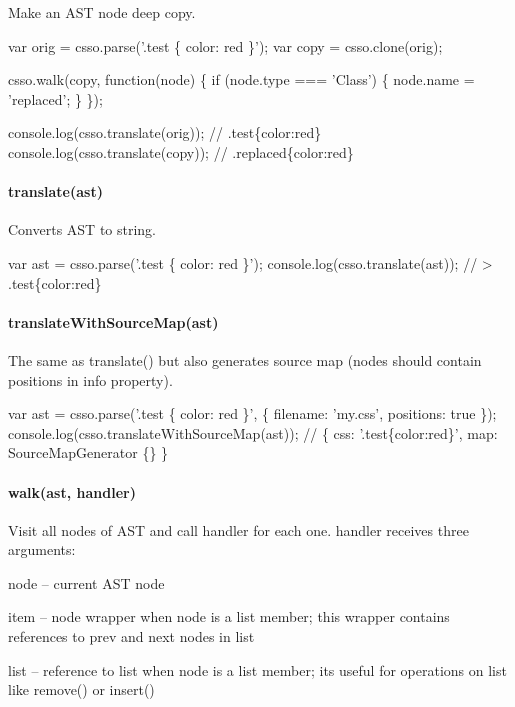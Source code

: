 Make an A\+ST node deep copy.


\begin{DoxyCode}
var orig = csso.parse('.test \{ color: red \}');
var copy = csso.clone(orig);

csso.walk(copy, function(node) \{
    if (node.type === 'Class') \{
        node.name = 'replaced';
    \}
\});

console.log(csso.translate(orig));
// .test\{color:red\}
console.log(csso.translate(copy));
// .replaced\{color:red\}
\end{DoxyCode}


\paragraph*{translate(ast)}

Converts A\+ST to string.


\begin{DoxyCode}
var ast = csso.parse('.test \{ color: red \}');
console.log(csso.translate(ast));
// > .test\{color:red\}
\end{DoxyCode}


\paragraph*{translate\+With\+Source\+Map(ast)}

The same as {\ttfamily translate()} but also generates source map (nodes should contain positions in {\ttfamily info} property).


\begin{DoxyCode}
var ast = csso.parse('.test \{ color: red \}', \{
    filename: 'my.css',
    positions: true
\});
console.log(csso.translateWithSourceMap(ast));
// \{ css: '.test\{color:red\}', map: SourceMapGenerator \{\} \}
\end{DoxyCode}


\paragraph*{walk(ast, handler)}

Visit all nodes of A\+ST and call handler for each one. {\ttfamily handler} receives three arguments\+:


\begin{DoxyItemize}
\item node – current A\+ST node
\item item – node wrapper when node is a list member; this wrapper contains references to {\ttfamily prev} and {\ttfamily next} nodes in list
\item list – reference to list when node is a list member; it\textquotesingle{}s useful for operations on list like {\ttfamily remove()} or {\ttfamily insert()}
\end{DoxyItemize}

